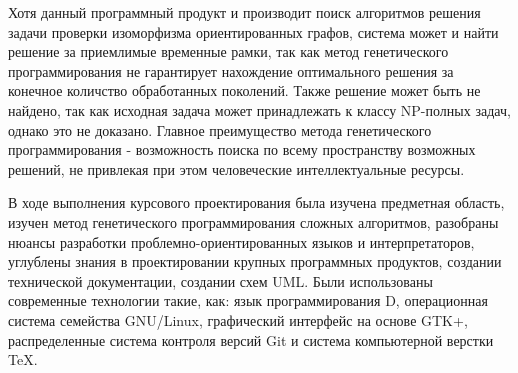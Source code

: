 \documentclass[russian,utf8,emptystyle]{eskdtext}
\begin{document}
\begin{spacing}{1.5}
Хотя данный программный продукт и производит поиск алгоритмов решения задачи проверки изоморфизма ориентированных графов, система может и найти решение за приемлимые временные рамки, так как метод генетического программирования не гарантирует нахождение оптимального решения за конечное количство обработанных поколений. Также решение может быть не найдено, так как исходная задача может принадлежать к классу NP-полных задач, однако это не доказано. Главное преимущество метода генетического программирования - возможность поиска по всему пространству возможных решений, не привлекая при этом человеческие интеллектуальные ресурсы.

В ходе выполнения курсового проектирования была изучена предметная область, изучен метод генетического программирования сложных алгоритмов, разобраны нюансы разработки проблемно-ориентированных языков и интерпретаторов, углублены знания в проектировании крупных программных продуктов, создании технической документации, создании схем UML. Были использованы современные технологии такие, как: язык программирования D, операционная система семейства GNU/Linux, графический интерфейс на основе GTK+, распределенные система контроля версий Git и система компьютерной верстки \TeX.

\newpage

\end{spacing}
\end{document}
